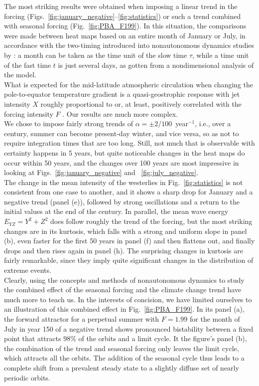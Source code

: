 \documentclass[%
 aip, cha,
 amsmath,amssymb,
 reprint,%
author-year,%
]{revtex4-1}
\newcommand{\0}{\mathbf 0}
\begin{document}
The most striking results were obtained when imposing a linear trend in the forcing (Figs.~\ref{fig:january_negative}--\ref{fig:statistics}) or such a trend combined with seasonal forcing (Fig.~\ref{fig:PBA_F199}). In this situation, the comparisons were made between heat maps based on an entire month of January or July, in accordance with the two-timing introduced into nonautonomous dynamics studies by \cite{Flandoli.ea.2022}: a month can be taken as the time unit of the slow time $\tau$, while a time unit of the fast time $t$ is just several days, as gotten from a nondimensional analysis of the model. \\
What is expected for the mid-latitude atmospheric circulation when changing the pole-to-equator temperature gradient is a quasi-geostrophic response with jet intensity $X$ roughly proportional to or, at least, positively correlated with the forcing intensity $F$ \citep{jetstream}. Our results are much more complex. \\
We chose to impose fairly strong trends of $\alpha = \pm 2/100$~year$^{-1}$, i.e., over a century, summer can become present-day winter, and vice versa, so as not to require integration times that are too long. Still, not much that is observable with certainty happens in 5 years, but quite noticeable changes in the heat maps do occur within 50 years, and the changes over 100 years are most impressive in looking at Figs.~\ref{fig:january_negative} and ~\ref{fig:july_negative}. \\
The change in the mean intensity of the westerlies in Fig.~\ref{fig:statistics} is not consistent from one case to another, and it shows a sharp drop for January and a negative trend (panel (e)), followed by strong oscillations and a return to the initial values at the end of the century. In parallel, the mean wave energy $E_{YZ} = Y^2 + Z^2$ does follow roughly the trend of the forcing, but the most striking changes are in its kurtosis, which falls with a strong and uniform slope in panel (b), even faster for the first 50 years in panel (f) and then flattens out, and finally drops and then rises again in panel (h). The surprising changes in kurtosis are fairly remarkable, since they imply quite significant changes in the distribution of extreme events.\\
Clearly, using the concepts and methods of nonautonomous dynamics to study the combined effect of the seasonal forcing and the climate change trend have much more to teach us. In the interests of concision, we have limited ourselves to an illustration of this combined effect in Fig.~\ref{fig:PBA_F199}. In its panel (a), the forward attractor for a perpetual summer with $F = 1.99$ for the month of July in year 150 of a negative trend shows pronounced bistability between a fixed point that attracts $98 \%$ of the orbits and a limit cycle. It the figure's panel (b), the combination of the trend and seasonal forcing only leaves the limit cycle, which attracts all the orbits. The addition of the seasonal cycle thus leads to a complete shift from a prevalent steady state to a slightly diffuse set of nearly periodic orbits.\\
\end{document}
